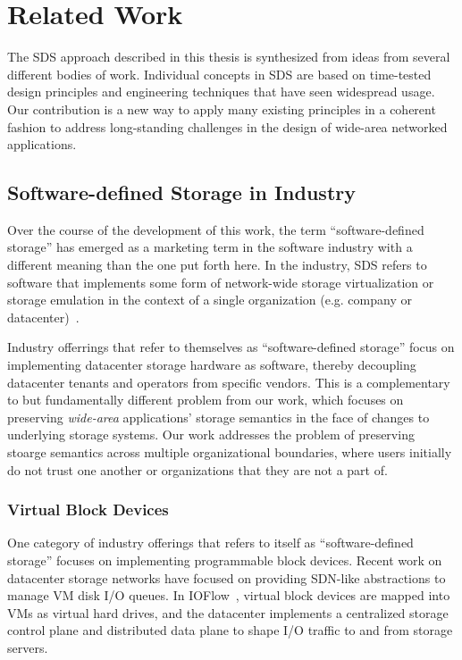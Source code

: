 \chapter{Related Work}
\label{chap:related-work}

The SDS approach described in this thesis
is synthesized from ideas from several different bodies of work.  Individual
concepts in SDS are based on time-tested design principles and engineering
techniques that have seen widespread usage.  Our contribution is
a new way to apply many existing principles in a coherent fashion
to address long-standing challenges in
the design of wide-area networked applications.

\section{Software-defined Storage in Industry}

Over the course of the development of this work, the term ``software-defined
storage'' has emerged as a marketing term in the software
industry with a different meaning than the one put forth here.
In the industry, SDS refers to software that implements some form of 
network-wide storage virtualization or storage emulation
in the context of a single organization (e.g. company or datacenter)~\cite{techcenter-sds-definition}.

Industry offerrings that refer to themselves as ``software-defined storage''
focus on implementing datacenter storage hardware as software, thereby
decoupling datacenter tenants and operators from specific vendors.  This is a
complementary to but fundamentally different problem from our work, which
focuses on preserving \emph{wide-area} applications' storage semantics in the face of
changes to underlying storage systems.  Our work addresses the problem of
preserving stoarge semantics across multiple organizational boundaries, where
users initially do not trust one another or organizations that they are not a
part of.

\subsection{Virtual Block Devices}

One category of industry offerings that refers to itself as ``software-defined
storage'' focuses on implementing programmable block devices.
Recent work on datacenter storage networks have focused on providing SDN-like
abstractions to manage VM disk I/O queues.  In
IOFlow~\cite{ioflow}, virtual block devices
are mapped into VMs as virtual hard drives, and the datacenter implements a
centralized storage control plane and distributed data plane to shape I/O traffic to and
from storage servers.

